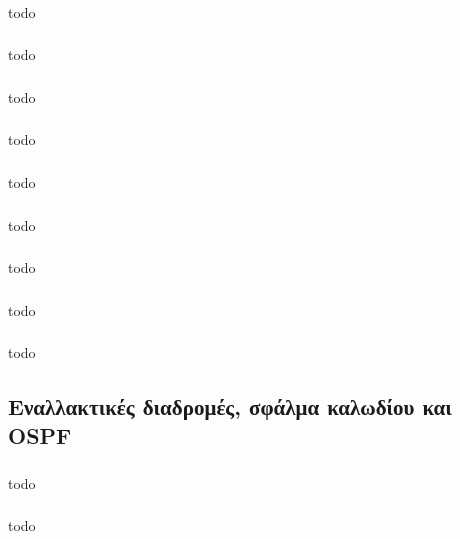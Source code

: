 \documentclass[a4paper, 12pt]{article}
\begin{document}
		\subsubsection{}
			todo

		\subsubsection{}
			todo

		\subsubsection{}
			todo

		\subsubsection{}
			todo

		\subsubsection{}
			todo

		\subsubsection{}
			todo

		\subsubsection{}
			todo

		\subsubsection{}
			todo

		\subsubsection{}
			todo

	\subsection{Εναλλακτικές διαδρομές, σφάλμα καλωδίου και OSPF}

		\subsubsection{}
			todo

		\subsubsection{}
			todo
\end{document}
